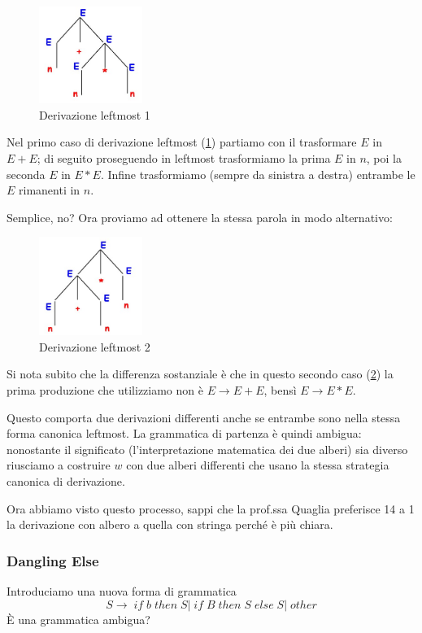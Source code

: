 \documentclass[class=book, crop=false, oneside]{standalone}
\begin{document}
\begin{figure}[H]
	\centering
	\includegraphics[width=0.3\textwidth,keepaspectratio]{leftmost_1.jpg}
    \caption{Derivazione leftmost 1}
    \label{leftmost_1}
\end{figure}
Nel primo caso di derivazione leftmost (\ref{leftmost_1}) partiamo con il trasformare $E$ in $E+E$; di seguito proseguendo in leftmost trasformiamo la prima $E$ in $n$, poi la seconda $E$ in $E*E$.
Infine trasformiamo (sempre da sinistra a destra) entrambe le $E$ rimanenti in $n$.

Semplice, no? Ora proviamo ad ottenere la stessa parola in modo alternativo:
\begin{figure}[H]
	\centering
	\includegraphics[width=0.3\textwidth,keepaspectratio]{leftmost_2.jpg}
    \caption{Derivazione leftmost 2}
    \label{leftmost_2}
\end{figure}
Si nota subito che la differenza sostanziale è che in questo secondo caso (\ref{leftmost_2}) la prima produzione che utilizziamo non è $E \to E+E$, bensì $E \to E*E$.

Questo comporta due derivazioni differenti anche se entrambe sono nella stessa forma canonica leftmost.
La grammatica di partenza è quindi ambigua: nonostante il significato (l'interpretazione matematica dei due alberi) sia diverso riusciamo a costruire $w$ con due alberi differenti che usano la stessa strategia canonica di derivazione.

Ora abbiamo visto questo processo, sappi che la prof.ssa Quaglia preferisce 14 a 1 la derivazione con albero a quella con stringa perché è più chiara.

\subsubsection*{Dangling Else}
Introduciamo una nuova forma di grammatica
\begin{equation}
    S \to \; if \; b \; then \; S |\; if\; B\; then\; S\; else\; S |\; other    
\end{equation}
È una grammatica ambigua?
\end{document}
